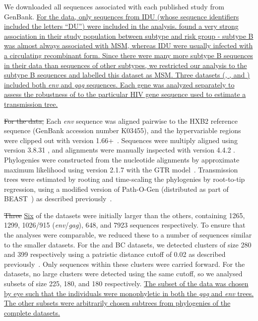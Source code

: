 We downloaded all sequences associated with each published study from GenBank.
{\color{blue}\uline{For the \textcite{niculescu2015recent} data, only sequences
from \gls{IDU} (whose sequence identifiers included the letters ``DU'') were
included in the analysis. \textcite{kao2011surveillance} found a very strong
association in their study population between subtype and risk group - subtype
B was almost always associated with \gls{MSM}, whereas \gls{IDU} were usually
infected with a circulating recombinant form. Since there were many more
subtype B sequences in their data than sequences of other subtypes, we
restricted our analysis to the subtype B sequences and labelled this dataset as
\gls{MSM}. Three datasets (\textcite{zetterberg2004two},
\textcite{grabowski2014role}, and \textcite{mccormack2002early}) included both
\textit{env} and \textit{gag} sequences. Each gene was analyzed separately to
assess the robustness of  to the particular \gls{HIV} gene
sequence used to estimate a transmission tree.}}

{\color{red}\sout{For the \textcite{novitsky2014impact} data,}} Each
\textit{env} sequence was aligned pairwise to the HXB2 reference sequence
(GenBank accession number K03455), and the hypervariable regions were clipped
out with  version 1.66+~\autocite{cock2009biopython}.
Sequences were multiply aligned using  version 3.8.31
\autocite{edgar2004muscle}, and alignments were manually inspected with
 version 4.4.2 \autocite{gouy2010seaview}. Phylogenies were
constructed from the nucleotide alignments by approximate maximum likelihood
using  version 2.1.7 \autocite{price2010fasttree} with the
\gls{GTR} model~\autocite{tavare1986some}. Transmission trees were estimated by
rooting and time-scaling the phylogenies by root-to-tip regression, using a
modified version of Path-O-Gen (distributed as part of
BEAST~\autocite{drummond2007beast}) as described
previously~\autocite{poon2015phylodynamic}. 

{\color{red}\sout{Three}} 
{\color{blue}\uline{Six}} of the datasets 
\autocite[][and the BC data]{li2015hiv,novitsky2014impact,grabowski2014role,little2014using}
were initially larger than the others, containing 1265, 1299, 1026/915
(\textit{env}/\textit{gag}), 648, and 7923 sequences respectively. To ensure
that the analyses were comparable, we reduced these to a number of sequences
similar to the smaller datasets. For the \citeauthor{li2015hiv} and BC
datasets, we detected clusters of size 280 and 399 respectively using a
patristic distance cutoff of 0.02 as described
previously~\autocite{poon2015impact}. Only sequences within these clusters were
carried forward. For the
\textcite{grabowski2014role,novitsky2014impact,little2014using} datasets, no
large clusters were detected using the same cutoff, so we analysed subsets of
size 225, 180, and 180 respectively. {\color{blue}\uline{The subset of the
\citeauthor{grabowski2014role} data was chosen by eye such that the individuals
were monophyletic in both the \textit{gag} and \textit{env} trees. The other
subsets were arbitrarily chosen subtrees from phylogenies of the complete
datasets.}}

